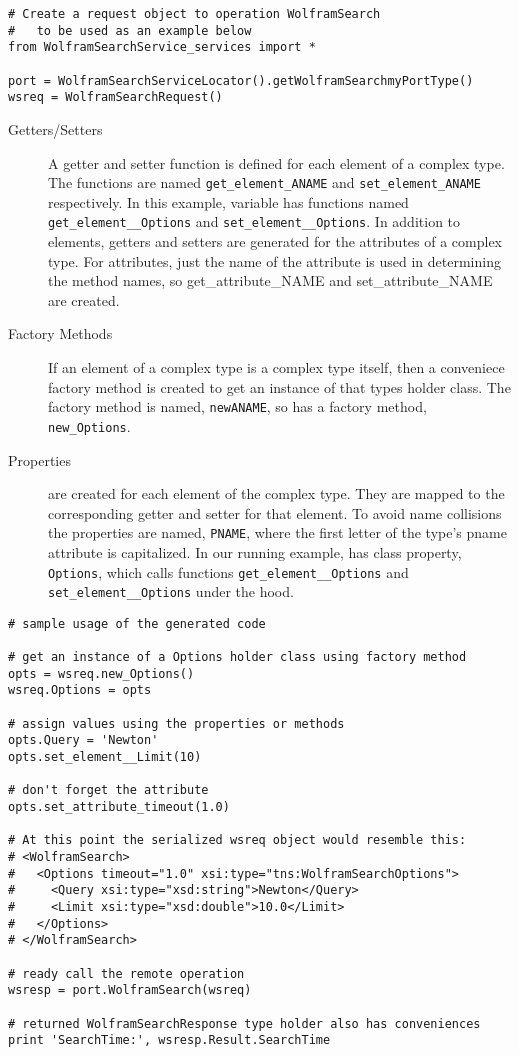 \begin{verbatim}
# Create a request object to operation WolframSearch
#   to be used as an example below
from WolframSearchService_services import *

port = WolframSearchServiceLocator().getWolframSearchmyPortType()
wsreq = WolframSearchRequest()
\end{verbatim}

\begin{description}
\item[Getters/Setters] A getter and setter function is defined for each element
of a complex type.  The functions are named \verb!get_element_ANAME! and
\verb!set_element_ANAME! respectively.  In this example, variable 
has functions named \verb!get_element__Options! and \verb!set_element__Options!.
 In addition to elements, getters and setters are generated for the attributes
 of a complex type.  For attributes, just the name of the attribute is used in
 determining the method names, so get_attribute_NAME and set_attribute_NAME are
 created.

\item[Factory Methods] If an element of a complex type is a complex type itself,
then a conveniece factory method is created to get an instance of that types
holder class.  The factory method is named, \verb!newANAME!, so  has
a factory method, \verb!new_Options!.

\item[Properties]
are created for each element of the complex type.  They are mapped to the
corresponding getter and setter for that element.  To avoid name collisions the
properties are named, \verb!PNAME!, where the first letter of the type's pname
attribute is capitalized.  In our running example,  has class
property, \verb!Options!, which calls functions \verb!get_element__Options! and
\verb!set_element__Options! under the hood.

\end{description}

\begin{verbatim}
# sample usage of the generated code

# get an instance of a Options holder class using factory method
opts = wsreq.new_Options()
wsreq.Options = opts

# assign values using the properties or methods
opts.Query = 'Newton'
opts.set_element__Limit(10)

# don't forget the attribute
opts.set_attribute_timeout(1.0)

# At this point the serialized wsreq object would resemble this:
# <WolframSearch>
#   <Options timeout="1.0" xsi:type="tns:WolframSearchOptions">
#     <Query xsi:type="xsd:string">Newton</Query>
#     <Limit xsi:type="xsd:double">10.0</Limit>
#   </Options>
# </WolframSearch>

# ready call the remote operation
wsresp = port.WolframSearch(wsreq)

# returned WolframSearchResponse type holder also has conveniences
print 'SearchTime:', wsresp.Result.SearchTime
\end{verbatim}


